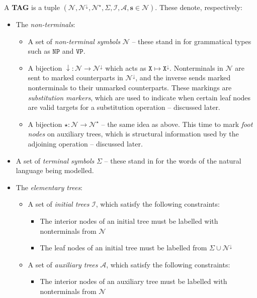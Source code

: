 \begin{fullwidth}
\begin{defn}
A \textbf{TAG} is a tuple $(\mathcal{N}, \mathcal{N}^\downarrow, \mathcal{N}^\star, \Sigma, \mathcal{I}, \mathcal{A}, \mathbf{s} \in \mathcal{N})$. These denote, respectively:
\begin{itemize}
	\item{ The \emph{non-terminals}:
		\begin{itemize}
			\item{A set of \emph{non-terminal symbols} $\mathcal{N}$ -- these stand in for grammatical types such as $\texttt{NP}$ and $\texttt{VP}$.}
			\item{A bijection $\downarrow: \mathcal{N} \rightarrow \mathcal{N}^\downarrow$ which acts as $\texttt{X} \mapsto \texttt{X}^\downarrow$. Nonterminals in $\mathcal{N}$ are sent to marked counterparts in $\mathcal{N}^\downarrow$, and the inverse sends marked nonterminals to their unmarked counterparts. These markings are \emph{substitution markers}, which are used to indicate when certain leaf nodes are valid targets for a substitution operation -- discussed later.}
			\item{A bijection $\star: \mathcal{N} \rightarrow \mathcal{N}^\star$ -- the same idea as above. This time to mark \emph{foot nodes} on auxiliary trees, which is structural information used by the adjoining operation -- discussed later.}
	\end{itemize}
	}
	\item{A set of \emph{terminal symbols} $\Sigma$ -- these stand in for the words of the natural language being modelled.}
	\item{The \emph{elementary trees}:
		\begin{itemize}
			\item{A set of \emph{initial trees} $\mathcal{I}$, which satisfy the following constraints:
			\begin{itemize}
				\item{The interior nodes of an initial tree must be labelled with nonterminals from $\mathcal{N}$}
				\item{The leaf nodes of an initial tree must be labelled from $\Sigma \cup \mathcal{N}^{\downarrow}$}
			\end{itemize}
			}
	\item{A set of \emph{auxiliary trees} $\mathcal{A}$, which satisfy the following constraints:
		\begin{itemize}
			\item{The interior nodes of an auxiliary tree must be labelled with nonterminals from $\mathcal{N}$}

\end{itemize}}
\end{itemize}}
\end{itemize}
\end{defn}
\end{fullwidth}
